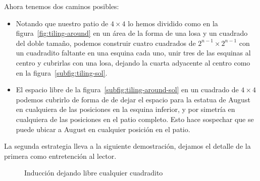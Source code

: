   Ahora tenemos dos caminos posibles:
  \begin{itemize}
  \item
    Notando que nuestro patio de \mbox{\(4 \times 4\)}
    lo hemos dividido
    como en la figura~\ref{fig:tiling-around}
    en un área de la forma de una losa
    y un cuadrado del doble tamaño,
    podemos construir
    cuatro cuadrados de \mbox{\(2^{n - 1} \times 2^{n - 1}\)}
    con un cuadradito faltante en una esquina cada uno,
    unir tres de las esquinas al centro y cubrirlas con una losa,
    dejando la cuarta adyacente al centro
    como en la figura~\ref{subfig:tiling-sol}.
  \item
    El espacio libre de la figura~\ref{subfig:tiling-around-sol}
    en un cuadrado de \mbox{\(4 \times 4\)}
    podemos cubrirlo de forma de de dejar el espacio
    para la estatua de \foreignlanguage{english}{August}
    en cualquiera de las posiciones en la esquina inferior,
    y por simetría
    en cualquiera de las posiciones en el patio completo.
    Esto hace sospechar
    que se puede ubicar a \foreignlanguage{english}{August}
    en cualquier posición en el patio.
  \end{itemize}
  La segunda estrategia lleva a la siguiente demostración,
  dejamos el detalle de la primera como entretención al lector.
  \begin{figure}[htbp]
    \centering
    \caption{Inducción dejando libre cualquier cuadradito}
    \label{fig:tiling-any}
  \end{figure}

